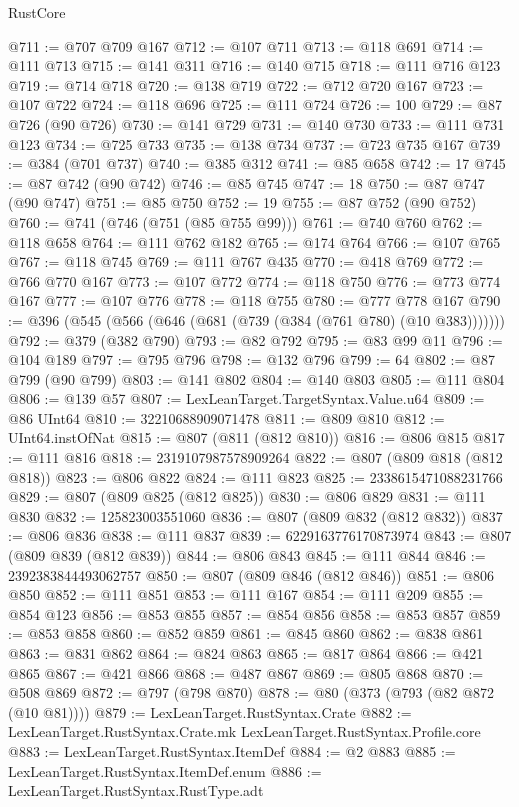 \begin{lexlean}{RustCore}
\begin{coremodule}
@711 := @707 @709 @167
@712 := @107 @711
@713 := @118 @691
@714 := @111 @713
@715 := @141 @311
@716 := @140 @715
@718 := @111 @716 @123
@719 := @714 @718
@720 := @138 @719
@722 := @712 @720 @167
@723 := @107 @722
@724 := @118 @696
@725 := @111 @724
@726 := 100
@729 := @87 @726 (@90 @726)
@730 := @141 @729
@731 := @140 @730
@733 := @111 @731 @123
@734 := @725 @733
@735 := @138 @734
@737 := @723 @735 @167
@739 := @384 (@701 @737)
@740 := @385 @312
@741 := @85 @658
@742 := 17
@745 := @87 @742 (@90 @742)
@746 := @85 @745
@747 := 18
@750 := @87 @747 (@90 @747)
@751 := @85 @750
@752 := 19
@755 := @87 @752 (@90 @752)
@760 := @741 (@746 (@751 (@85 @755 @99)))
@761 := @740 @760
@762 := @118 @658
@764 := @111 @762 @182
@765 := @174 @764
@766 := @107 @765
@767 := @118 @745
@769 := @111 @767 @435
@770 := @418 @769
@772 := @766 @770 @167
@773 := @107 @772
@774 := @118 @750
@776 := @773 @774 @167
@777 := @107 @776
@778 := @118 @755
@780 := @777 @778 @167
@790 := @396 (@545 (@566 (@646 (@681 (@739 (@384 (@761 @780) (@10 @383)))))))
@792 := @379 (@382 @790)
@793 := @82 @792
@795 := @83 @99 @11
@796 := @104 @189
@797 := @795 @796
@798 := @132 @796
@799 := 64
@802 := @87 @799 (@90 @799)
@803 := @141 @802
@804 := @140 @803
@805 := @111 @804
@806 := @139 @57
@807 := LexLeanTarget.TargetSyntax.Value.u64
@809 := @86 UInt64
@810 := 32210688909071478
@811 := @809 @810
@812 := UInt64.instOfNat
@815 := @807 (@811 (@812 @810))
@816 := @806 @815
@817 := @111 @816
@818 := 2319107987578909264
@822 := @807 (@809 @818 (@812 @818))
@823 := @806 @822
@824 := @111 @823
@825 := 2338615471088231766
@829 := @807 (@809 @825 (@812 @825))
@830 := @806 @829
@831 := @111 @830
@832 := 125823003551060
@836 := @807 (@809 @832 (@812 @832))
@837 := @806 @836
@838 := @111 @837
@839 := 6229163776170873974
@843 := @807 (@809 @839 (@812 @839))
@844 := @806 @843
@845 := @111 @844
@846 := 2392383844493062757
@850 := @807 (@809 @846 (@812 @846))
@851 := @806 @850
@852 := @111 @851
@853 := @111 @167
@854 := @111 @209
@855 := @854 @123
@856 := @853 @855
@857 := @854 @856
@858 := @853 @857
@859 := @853 @858
@860 := @852 @859
@861 := @845 @860
@862 := @838 @861
@863 := @831 @862
@864 := @824 @863
@865 := @817 @864
@866 := @421 @865
@867 := @421 @866
@868 := @487 @867
@869 := @805 @868
@870 := @508 @869
@872 := @797 (@798 @870)
@878 := @80 (@373 (@793 (@82 @872 (@10 @81))))
@879 := LexLeanTarget.RustSyntax.Crate
@882 := LexLeanTarget.RustSyntax.Crate.mk LexLeanTarget.RustSyntax.Profile.core
@883 := LexLeanTarget.RustSyntax.ItemDef
@884 := @2 @883
@885 := LexLeanTarget.RustSyntax.ItemDef.enum
@886 := LexLeanTarget.RustSyntax.RustType.adt

\end{coremodule}
\end{lexlean}
